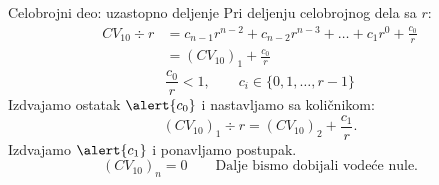 \begin{frame}[label=04-s008]{Celobrojni deo: uzastopno deljenje}
\setlength{\abovedisplayskip}{3pt}\setlength{\belowdisplayskip}{3pt}
Pri deljenju celobrojnog dela sa $r$:
\[\begin{aligned}CV_{10}\div r&=c_{n-1}r^{n-2}+c_{n-2}r^{n-3}+\ldots+c_1r^0+\frac{c_0}{r}\\&=(CV_{10})_1+\frac{c_0}{r}\end{aligned}\]
\[\frac{c_0}{r}<1,\qquad c_i\in\{0,1,\ldots,r-1\}\]
Izdvajamo ostatak $\alert{c_0}$ i nastavljamo sa količnikom:
\[(CV_{10})_1\div r=(CV_{10})_2+\frac{c_1}{r}.\]
Izdvajamo $\alert{c_1}$ i ponavljamo postupak.
\[(CV_{10})_n=0\qquad\text{Dalje bismo dobijali vodeće nule.}\]
\end{frame}
